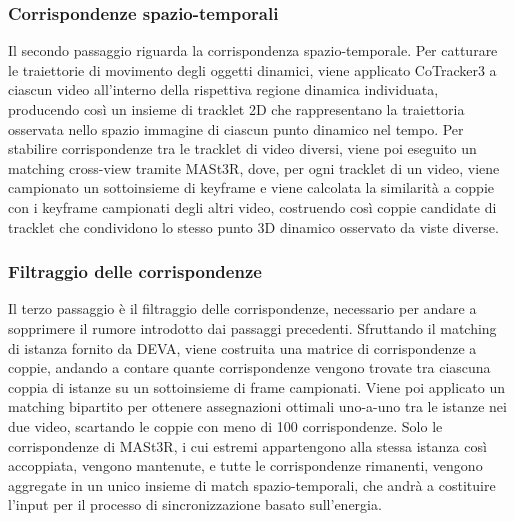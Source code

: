 
\subsubsection{Corrispondenze spazio-temporali}
Il secondo passaggio riguarda la corrispondenza spazio-temporale. Per catturare le traiettorie di movimento degli oggetti dinamici, viene applicato CoTracker3 a ciascun video all'interno della rispettiva regione dinamica individuata, producendo così un insieme di tracklet 2D che rappresentano la traiettoria osservata nello spazio immagine di ciascun punto dinamico nel tempo. Per stabilire corrispondenze tra le tracklet di video diversi, viene poi eseguito un matching cross-view tramite MASt3R, dove, per ogni tracklet di un video, viene campionato un sottoinsieme di keyframe e viene calcolata la similarità a coppie con i keyframe campionati degli altri video, costruendo così coppie candidate di tracklet che condividono lo stesso punto 3D dinamico osservato da viste diverse.


\subsubsection{Filtraggio delle corrispondenze}
Il terzo passaggio è il filtraggio delle corrispondenze, necessario per andare a sopprimere il rumore introdotto dai passaggi precedenti. Sfruttando il matching di istanza fornito da DEVA, viene costruita una matrice di corrispondenze a coppie, andando a contare quante corrispondenze vengono trovate tra ciascuna coppia di istanze su un sottoinsieme di frame campionati. Viene poi applicato un matching bipartito per ottenere assegnazioni ottimali uno-a-uno tra le istanze nei due video, scartando le coppie con meno di 100 corrispondenze. Solo le corrispondenze di MASt3R, i cui estremi appartengono alla stessa istanza così accoppiata, vengono mantenute, e tutte le corrispondenze rimanenti, vengono aggregate in un unico insieme di match spazio-temporali, che andrà a costituire l'input per il processo di sincronizzazione basato sull'energia.


